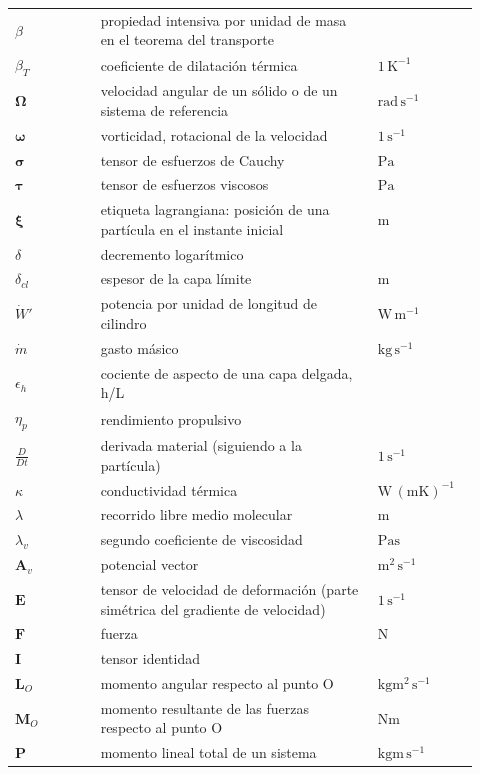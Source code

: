 \documentclass[10pt,openany]{book}
\begin{document}
\begin{longtable}{@{}>{\centering\arraybackslash}p{0.17\linewidth}>{\raggedright\arraybackslash}p{0.55\linewidth}>{\raggedright\arraybackslash}p{0.2\linewidth}@{}}
$\beta$ & propiedad intensiva por unidad de masa en el teorema del transporte &  \\
$\beta_T$ & coeficiente de dilatación térmica & $\mathrm{1\,K^{-1}}$ \\
$\boldsymbol{\Omega}$ & velocidad angular de un sólido o de un sistema de referencia & $\mathrm{rad\,s^{-1}}$ \\
$\boldsymbol{\omega}$ & vorticidad, rotacional de la velocidad & $\mathrm{1\,s^{-1}}$ \\
$\boldsymbol{\sigma}$ & tensor de esfuerzos de Cauchy & $\mathrm{Pa}$ \\
$\boldsymbol{\tau}$ & tensor de esfuerzos viscosos & $\mathrm{Pa}$ \\
$\boldsymbol{\xi}$ & etiqueta lagrangiana: posición de una partícula en el instante inicial & $\mathrm{m}$ \\
$\delta$ & decremento logarítmico &  \\
$\delta_{cl}$ & espesor de la capa límite & $\mathrm{m}$ \\
$\dot W'$ & potencia por unidad de longitud de cilindro & $\mathrm{W\,m^{-1}}$ \\
$\dot m$ & gasto másico & $\mathrm{kg\,s^{-1}}$ \\
$\epsilon_h$ & cociente de aspecto de una capa delgada, h/L &  \\
$\eta_p$ & rendimiento propulsivo &  \\
$\frac{D}{Dt}$ & derivada material (siguiendo a la partícula) & $\mathrm{1\,s^{-1}}$ \\
$\kappa$ & conductividad térmica & $\mathrm{W\,(m K)^{-1}}$ \\
$\lambda$ & recorrido libre medio molecular & $\mathrm{m}$ \\
$\lambda_v$ & segundo coeficiente de viscosidad & $\mathrm{Pa s}$ \\
$\mathbf{A}_v$ & potencial vector & $\mathrm{m^{2}\,s^{-1}}$ \\
$\mathbf{E}$ & tensor de velocidad de deformación (parte simétrica del gradiente de velocidad) & $\mathrm{1\,s^{-1}}$ \\
$\mathbf{F}$ & fuerza & $\mathrm{N}$ \\
$\mathbf{I}$ & tensor identidad &  \\
$\mathbf{L}_O$ & momento angular respecto al punto O & $\mathrm{kg m^{2}\,s^{-1}}$ \\
$\mathbf{M}_O$ & momento resultante de las fuerzas respecto al punto O & $\mathrm{N m}$ \\
$\mathbf{P}$ & momento lineal total de un sistema & $\mathrm{kg m\,s^{-1}}$ \\

\end{longtable}
\end{document}

